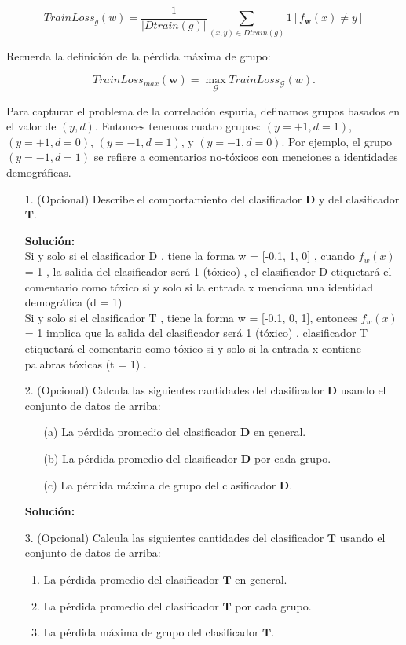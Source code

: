 \documentclass[11pt,letterpaper]{article}
\newenvironment{solution}{%
  \noindent\begin{shaded}
  \textbf{Solución:}\ }{
  \end{shaded}%
}
\begin{document}
\[TrainLoss_{g}(w)=\frac{1}{|Dtrain(g)|} \sum_{(x,y)\in Dtrain(g)}^{} 1[f_{\mathbf{w}}(x) \neq y]\]


Recuerda la definición de la pérdida máxima de grupo:

\[{TrainLoss}_{max}(\mathbf{w}) = \max_{\mathcal{G}} {TrainLoss}_{\mathcal{G}} ({w}).
\]

Para capturar el problema de la correlación espuria, definamos grupos basados en el valor de $(y, d)$. Entonces tenemos cuatro grupos: $(y = +1, d = 1)$, $(y = +1, d = 0)$, $(y = -1, d = 1)$, y $(y = -1, d = 0)$. Por ejemplo, el grupo $(y = -1, d = 1)$ se refiere a comentarios no-tóxicos con menciones a identidades demográficas.

\begin{enumerate}

\item [1.]
(Opcional) Describe el comportamiento del clasificador $\mathbf{D}$ y del clasificador $\mathbf{T}$.

  \begin{solution}
 \\ Si y solo si el clasificador D , tiene la forma w = [-0.1, 1, 0] , cuando $f_w(x)$= 1 , la salida del clasificador será 1 (tóxico) , el clasificador D etiquetará el comentario como tóxico si y solo si la entrada x menciona una identidad demográfica (d = 1) \\
Si y solo si el clasificador T , tiene la forma w = [-0.1, 0, 1], entonces $f_w(x)$= 1 implica que la salida del clasificador será 1 (tóxico) , clasificador T etiquetará el comentario como tóxico si y solo si la entrada x contiene palabras tóxicas (t = 1) . 

  \end{solution}
\item [2.]
(Opcional) Calcula las siguientes cantidades del clasificador $\mathbf{D}$ usando el conjunto de datos de arriba:
\begin{enumerate}
    \item[(a)] La pérdida promedio del clasificador $\mathbf{D}$ en general.
    \item[(b)] La pérdida promedio del clasificador $\mathbf{D}$ por cada grupo.
    \item[(c)] La pérdida máxima de grupo del clasificador $\mathbf{D}$.
\end{enumerate}


  \begin{solution}

  \end{solution}
\item[3.]
(Opcional) Calcula las siguientes cantidades del clasificador $\mathbf{T}$ usando el conjunto de datos de arriba:
\begin{enumerate}
    \item La pérdida promedio del clasificador $\mathbf{T}$ en general.
    \item La pérdida promedio del clasificador $\mathbf{T}$ por cada grupo.
    \item La pérdida máxima de grupo del clasificador $\mathbf{T}$.
\end{enumerate}


\end{enumerate}
\end{document}
